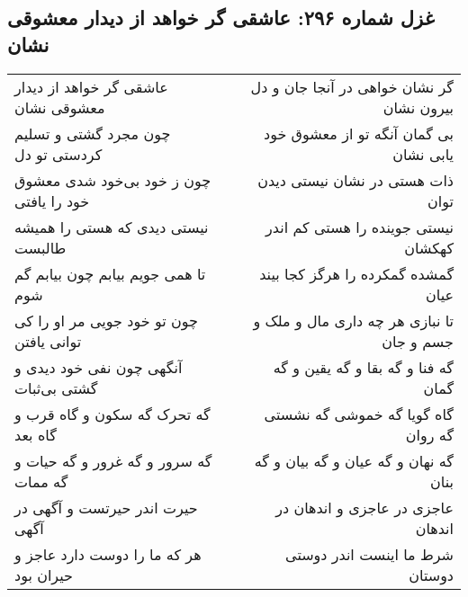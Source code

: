 \begin{center}
\section*{غزل شماره ۲۹۶: عاشقی گر خواهد از دیدار معشوقی نشان}
\label{sec:296}
\begin{longtable}{l p{0.5cm} r}
عاشقی گر خواهد از دیدار معشوقی نشان
&&
گر نشان خواهی در آنجا جان و دل بیرون نشان
\\
چون مجرد گشتی و تسلیم کردستی تو دل
&&
بی گمان آنگه تو از معشوق خود یابی نشان
\\
چون ز خود بی‌خود شدی معشوق خود را یافتی
&&
ذات هستی در نشان نیستی دیدن توان
\\
نیستی دیدی که هستی را همیشه طالبست
&&
نیستی جوینده را هستی کم اندر کهکشان
\\
تا همی جویم بیابم چون بیابم گم شوم
&&
گمشده گمکرده را هرگز کجا بیند عیان
\\
چون تو خود جویی مر او را کی توانی یافتن
&&
تا نبازی هر چه داری مال و ملک و جسم و جان
\\
آنگهی چون نفی خود دیدی و گشتی بی‌ثبات
&&
گه فنا و گه بقا و گه یقین و گه گمان
\\
گه تحرک گه سکون و گاه قرب و گاه بعد
&&
گاه گویا گه خموشی گه نشستی گه روان
\\
گه سرور و گه غرور و گه حیات و گه ممات
&&
گه نهان و گه عیان و گه بیان و گه بنان
\\
حیرت اندر حیرتست و آگهی در آگهی
&&
عاجزی در عاجزی و اندهان در اندهان
\\
هر که ما را دوست دارد عاجز و حیران بود
&&
شرط ما اینست اندر دوستی دوستان
\\
\end{longtable}
\end{center}
